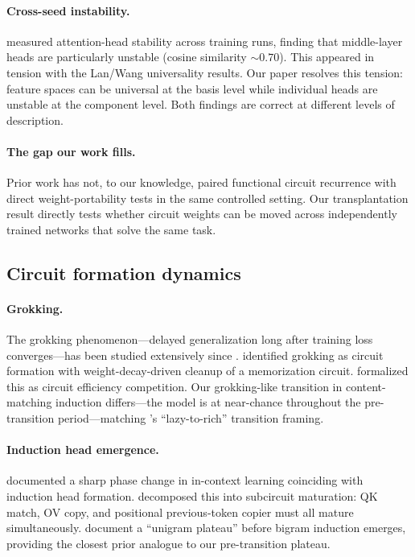 \documentclass[final]{article}
\begin{document}
\paragraph{Cross-seed instability.}
\citet{bali2026headstability} measured attention-head stability across training
runs, finding that middle-layer heads are particularly unstable (cosine
similarity ${\sim}0.70$). This appeared in tension with the Lan/Wang
universality results. Our paper resolves this tension: feature spaces can be
universal at the basis level while individual heads are unstable at the
component level. Both findings are correct at different levels of description.

\paragraph{The gap our work fills.}
Prior work has not, to our knowledge, paired functional circuit recurrence with
direct weight-portability tests in the same controlled setting. Our
transplantation result directly tests whether circuit weights can be moved
across independently trained networks that solve the same task.

\subsection{Circuit formation dynamics}

\paragraph{Grokking.}
The grokking phenomenon---delayed generalization long after training loss
converges---has been studied extensively since \citet{power2022grokking}.
\citet{nanda2023grokking} identified grokking as circuit formation with
weight-decay-driven cleanup of a memorization circuit.
\citet{varma2023grokking} formalized this as circuit efficiency competition.
Our grokking-like transition in content-matching induction differs---the model
is at near-chance throughout the pre-transition period---matching
\citet{kumar2024lazyrich}'s ``lazy-to-rich'' transition framing.

\paragraph{Induction head emergence.}
\citet{olsson2022induction} documented a sharp phase change in in-context
learning coinciding with induction head formation. \citet{singh2024induction}
decomposed this into subcircuit maturation: QK match, OV copy, and positional
previous-token copier must all mature simultaneously. \citet{edelman2024evolution}
document a ``unigram plateau'' before bigram induction emerges, providing the
closest prior analogue to our pre-transition plateau.
\end{document}
